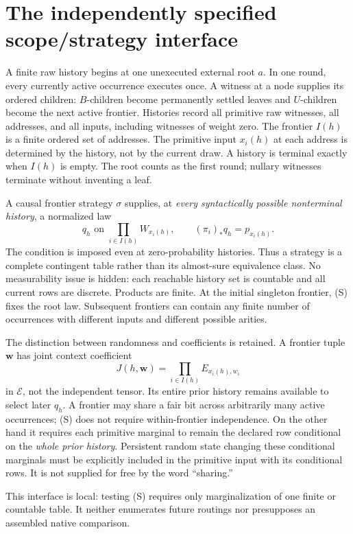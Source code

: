 \documentclass[11pt]{article}
\newcommand{\E}{\mathcal E}
\begin{document}
\section{The independently specified scope/strategy interface}
A finite raw history begins at one unexecuted external root $a$. In one round, every currently active occurrence executes once. A witness at a node supplies its ordered children: $B$-children become permanently settled leaves and $U$-children become the next active frontier. Histories record all primitive raw witnesses, all addresses, and all inputs, including witnesses of weight zero. The frontier $I(h)$ is a finite ordered set of addresses. The primitive input $x_i(h)$ at each address is determined by the history, not by the current draw. A history is terminal exactly when $I(h)$ is empty. The root counts as the first round; nullary witnesses terminate without inventing a leaf.

A causal frontier strategy $\sigma$ supplies, at \emph{every syntactically possible nonterminal history}, a normalized law
\[
 q_h\text{ on }\prod_{i\in I(h)}W_{x_i(h)},\qquad
 (\pi_i)_*q_h=p_{x_i(h)}.                                      \tag{S}
\]
The condition is imposed even at zero-probability histories. Thus a strategy is a complete contingent table rather than its almost-sure equivalence class. No measurability issue is hidden: each reachable history set is countable and all current rows are discrete. Products are finite. At the initial singleton frontier, (S) fixes the root law. Subsequent frontiers can contain any finite number of occurrences with different inputs and different possible arities.

The distinction between randomness and coefficients is retained. A frontier tuple $\mathbf w$ has joint context coefficient
\[
 J(h,\mathbf w)=\prod_{i\in I(h)}E_{x_i(h),w_i}
\]
in $\E$, not the independent tensor. Its entire prior history remains available to select later $q_h$. A frontier may share a fair bit across arbitrarily many active occurrences; (S) does not require within-frontier independence. On the other hand it requires each primitive marginal to remain the declared row conditional on the \emph{whole prior history}. Persistent random state changing these conditional marginals must be explicitly included in the primitive input with its conditional rows. It is not supplied for free by the word ``sharing.''

This interface is local: testing (S) requires only marginalization of one finite or countable table. It neither enumerates future routings nor presupposes an assembled native comparison.
\end{document}
